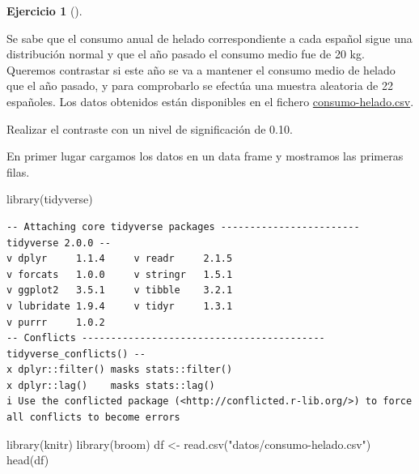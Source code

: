 \documentclass[
  a4paper,
]{scrreport}
\newenvironment{Shaded}{\begin{snugshade}}{\end{snugshade}}
\newcommand{\FunctionTok}[1]{\textcolor[rgb]{0.28,0.35,0.67}{#1}}
\newcommand{\NormalTok}[1]{\textcolor[rgb]{0.00,0.23,0.31}{#1}}
\newcommand{\OtherTok}[1]{\textcolor[rgb]{0.00,0.23,0.31}{#1}}
\newcommand{\StringTok}[1]{\textcolor[rgb]{0.13,0.47,0.30}{#1}}
\theoremstyle{definition}
\newtheorem{exercise}{Ejercicio}[chapter]
\theoremstyle{remark}
\begin{document}
\begin{exercise}[]\protect\hypertarget{exr-contraste-media-consumo}{}\label{exr-contraste-media-consumo}

Se sabe que el consumo anual de helado correspondiente a cada español
sigue una distribución normal y que el año pasado el consumo medio fue
de 20 kg. Queremos contrastar si este año se va a mantener el consumo
medio de helado que el año pasado, y para comprobarlo se efectúa una
muestra aleatoria de 22 españoles. Los datos obtenidos están disponibles
en el fichero \href{datos/consumo-helado.csv}{consumo-helado.csv}.

Realizar el contraste con un nivel de significación de 0.10.

\end{exercise}

\begin{tcolorbox}[enhanced jigsaw, breakable, opacityback=0, colbacktitle=quarto-callout-tip-color!10!white, colframe=quarto-callout-tip-color-frame, left=2mm, titlerule=0mm, coltitle=black, colback=white, bottomtitle=1mm, toptitle=1mm, opacitybacktitle=0.6, title=\textcolor{quarto-callout-tip-color}{\faLightbulb}\hspace{0.5em}{Solución}, leftrule=.75mm, bottomrule=.15mm, toprule=.15mm, rightrule=.15mm, arc=.35mm]

En primer lugar cargamos los datos en un data frame y mostramos las
primeras filas.

\begin{Shaded}
\begin{Highlighting}[]
\FunctionTok{library}\NormalTok{(tidyverse)}
\end{Highlighting}
\end{Shaded}

\begin{verbatim}
-- Attaching core tidyverse packages ------------------------ tidyverse 2.0.0 --
v dplyr     1.1.4     v readr     2.1.5
v forcats   1.0.0     v stringr   1.5.1
v ggplot2   3.5.1     v tibble    3.2.1
v lubridate 1.9.4     v tidyr     1.3.1
v purrr     1.0.2     
-- Conflicts ------------------------------------------ tidyverse_conflicts() --
x dplyr::filter() masks stats::filter()
x dplyr::lag()    masks stats::lag()
i Use the conflicted package (<http://conflicted.r-lib.org/>) to force all conflicts to become errors
\end{verbatim}

\begin{Shaded}
\begin{Highlighting}[]
\FunctionTok{library}\NormalTok{(knitr)}
\FunctionTok{library}\NormalTok{(broom)}
\NormalTok{df }\OtherTok{\textless{}{-}} \FunctionTok{read.csv}\NormalTok{(}\StringTok{"datos/consumo{-}helado.csv"}\NormalTok{)}
\FunctionTok{head}\NormalTok{(df)}
\end{Highlighting}
\end{Shaded}


\end{tcolorbox}
\end{document}
